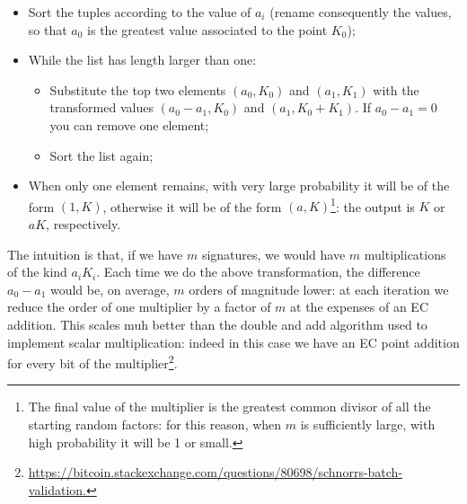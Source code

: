\begin{itemize}
	\item Sort the tuples according to the value of $a_i$ (rename consequently the values, so that $a_0$ is the greatest value associated to the point $K_0$);
	\item While the list has length larger than one:
	\begin{itemize}
		\item Substitute the top two elements $(a_0, K_0)$ and $(a_1, K_1)$ with the transformed values $(a_0 - a_1, K_0)$ and $(a_1, K_0 + K_1)$. If $a_0 - a_1 = 0$ you can remove one element;
		\item Sort the list again;
	\end{itemize}
\item When only one element remains, with very large probability it will be of the form $(1, K)$, otherwise it will be of the form $(a, K)$\footnote{The final value of the multiplier is the greatest common divisor of all the starting random factors: for this reason, when $m$ is sufficiently large, with high probability it will be 1 or small.}: the output is $K$ or $aK$, respectively.
\end{itemize}
The intuition is that, if we have $m$ signatures, we would have $m$ multiplications of the kind $a_iK_i$. Each time we do the above transformation, the difference $a_0 - a_1$ would be, on average, $m$ orders of magnitude lower: at each iteration we reduce the order of one multiplier by a factor of $m$ at the expenses of an EC addition. This scales muh better than the double and add algorithm used to implement scalar multiplication: indeed in this case we have an EC point addition for every bit of the multiplier\footnote{\url{https://bitcoin.stackexchange.com/questions/80698/schnorrs-batch-validation.}}.


